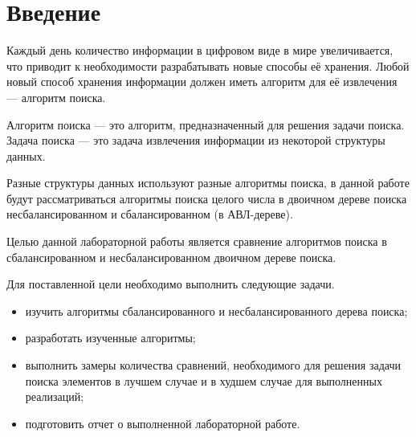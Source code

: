 \chapter*{Введение}

Каждый день количество информации в цифровом виде в мире увеличивается, что приводит к необходимости разрабатывать новые способы её хранения.
Любой новый способ хранения информации должен иметь алгоритм для её извлечения --- алгоритм поиска.

Алгоритм поиска --- это алгоритм, предназначенный для решения задачи поиска.
Задача поиска --- это задача извлечения информации из некоторой структуры данных.

Разные структуры данных используют разные алгоритмы поиска, в данной работе будут рассматриваться алгоритмы поиска целого числа в двоичном дереве поиска несбалансированном и сбалансированном (в АВЛ-дереве).

Целью данной лабораторной работы является сравнение алгоритмов поиска в сбалансированном и несбалансированном двоичном дереве поиска.

Для поставленной цели необходимо выполнить следующие задачи.

\begin{itemize}
	\item изучить алгоритмы сбалансированного и несбалансированного дерева поиска;
	\item разработать изученные алгоритмы;
	\item выполнить замеры количества сравнений, необходимого для решения задачи поиска элементов в лучшем случае и в худшем случае для выполненных реализаций;
	\item подготовить отчет о выполненной лабораторной работе.
\end{itemize}
